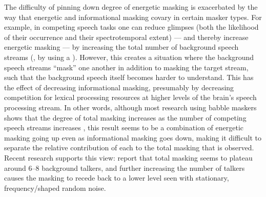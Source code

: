 
The difficulty of pinning down degree of energetic masking is exacerbated by the way that energetic and informational masking covary in certain masker types.  For example, in competing speech tasks one can reduce glimpses (both the likelihood of their occurrence and their spectrotemporal extent) — and thereby increase energetic masking — by increasing the total number of background speech streams (\ie, by using a ).  However, this creates a situation where the background speech streams “mask” one another in addition to masking the target stream, such that the background speech itself becomes harder to understand.  This has the effect of decreasing informational masking, presumably by decreasing competition for lexical processing resources at higher levels of the brain’s speech processing stream.  In other words, although most research using babble maskers shows that the degree of total masking increases as the number of competing speech streams increases \citep[\eg,][]{Miller1947, BrungartEtAl2001}, this result seems to be a combination of energetic masking going up even as informational masking goes down, making it difficult to separate the relative contribution of each to the total masking that is observed.  Recent research supports this view: \citet{SimpsonCooke2005} report that total masking seems to plateau around 6–8 background talkers, and further increasing the number of talkers causes the masking to recede back to a lower level seen with stationary, frequency\-/shaped random noise.  %
